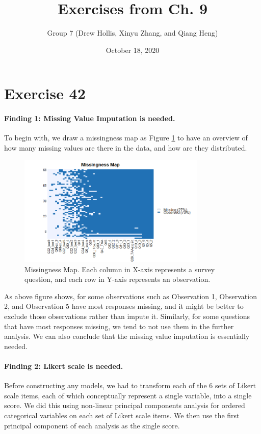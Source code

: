 \documentclass[12pt, letterpaper]{article}
\begin{document}
\title{Exercises from Ch. 9}
\date{October 18, 2020}
\author{Group 7 (Drew Hollis, Xinyu Zhang, and Qiang Heng)}
\maketitle

\section{Exercise 42}

\paragraph{Finding 1: Missing Value Imputation is needed.}
To begin with,  we draw a missingness map  as Figure \ref{fig1: missmap} to have an overview of how many missing values are there in the data, and how are they distributed.

\begin{figure}[H]
\centering
\includegraphics[width=0.8\textwidth]{missmap.png}
\caption{Missingness Map. Each column in X-axis represents a survey question, and each row in Y-axis represents an observation.}
\label{fig1: missmap}
\end{figure}

As above figure shows, for some observations such as Observation 1, Observation 2, and Observation 5 have most responses missing, and it might be better to exclude those observations rather than impute it. Similarly, for some questions that have most responses missing, we tend to not use them in the further analysis. We can also conclude that the missing value imputation is essentially needed.

\paragraph{Finding 2: Likert scale is needed.}
Before constructing any models, we had to transform each of the 6 sets of Likert scale items, each of which conceptually represent a single variable, into a single score. We did this using non-linear principal components analysis for ordered categorical variables on each set of Likert scale items. We then use the first principal component of each analysis as the single score.\\
\end{document}
